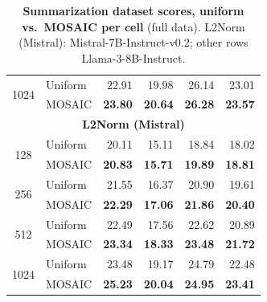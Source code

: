 \begin{table}[tp]
\begin{tabular}{@{} c l rrrr @{}}
    \cmidrule(l){1-6}
    \multirow{2}{*}{1024} & Uniform & 22.91 & 19.98 & 26.14 & 23.01 \\
     & MOSAIC & \textbf{23.80} & \textbf{20.64} & \textbf{26.28} & \textbf{23.57} \\
    \midrule
    \multicolumn{6}{c}{\textbf{L2Norm (Mistral)}} \\
    \midrule
    \multirow{2}{*}{128} & Uniform & 20.11 & 15.11 & 18.84 & 18.02 \\
     & MOSAIC & \textbf{20.83} & \textbf{15.71} & \textbf{19.89} & \textbf{18.81} \\
    \cmidrule(l){1-6}
    \multirow{2}{*}{256} & Uniform & 21.55 & 16.37 & 20.90 & 19.61 \\
     & MOSAIC & \textbf{22.29} & \textbf{17.06} & \textbf{21.86} & \textbf{20.40} \\
    \cmidrule(l){1-6}
    \multirow{2}{*}{512} & Uniform & 22.49 & 17.56 & 22.62 & 20.89 \\
     & MOSAIC & \textbf{23.34} & \textbf{18.33} & \textbf{23.48} & \textbf{21.72} \\
    \cmidrule(l){1-6}
    \multirow{2}{*}{1024} & Uniform & 23.48 & 19.17 & 24.79 & 22.48 \\
     & MOSAIC & \textbf{25.23} & \textbf{20.04} & \textbf{24.95} & \textbf{23.41} \\
    \bottomrule
  \end{tabular}
  \caption{\textbf{Summarization dataset scores, uniform vs.\ MOSAIC per cell} (full data). L2Norm (Mistral): Mistral-7B-Instruct-v0.2; other rows Llama-3-8B-Instruct.}
  \label{tab:app-lb-SUMMARIZATION}
\end{table}

